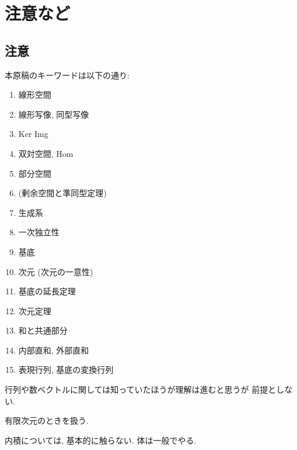 \chapter{注意など}
\label{chap:prelim}
\section{注意}
本原稿のキーワードは以下の通り:
\begin{enumerate}
\item 線形空間
\item 線形写像, 同型写像
\item Ker Img
\item 双対空間, Hom
\item 部分空間
\item (剰余空間と準同型定理)
\item 生成系
\item 一次独立性
\item 基底
\item 次元 (次元の一意性)
\item 基底の延長定理
\item 次元定理
\item 和と共通部分
\item 内部直和, 外部直和
\item 表現行列, 基底の変換行列
\end{enumerate}

行列や数ベクトルに関しては知っていたほうが理解は進むと思うが
前提としない.

有限次元のときを扱う.

内積については, 基本的に触らない.
体は一般でやる.
